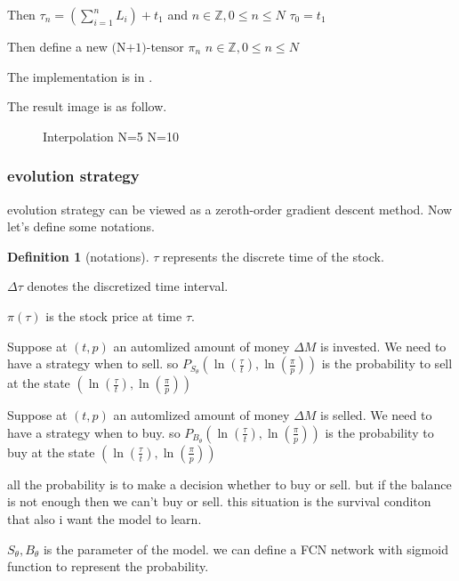 \documentclass{article}
\theoremstyle{definition} %
\newtheorem{definition}{Definition}[section]
\begin{document}
Then $\tau_n=(\sum_{i=1}^{n}L_i)+t_1$
and
$n\in\mathbb{Z},0\leq n\leq N$
$\tau_0=t_1$

Then define a new $\text{(N+1)-tensor}$
$\pi_n$
$n\in\mathbb{Z},0\leq n\leq N$

The implementation is in
\cite[computeGraph]{Data_process}.

The result image is as follow.
\begin{figure}[!ht]
    \centering
    \caption{Interpolation N=5 N=10}
\end{figure}

\subsubsection{evolution strategy}
evolution strategy can be viewed as a
zeroth-order gradient descent method.
Now let's define some notations.
\begin{definition}[notations]
    \label{def:notations}
    $\tau$ represents the discrete time of the stock.

    $\Delta\tau$ denotes the discretized time interval.

    $\pi(\tau)$ is the stock price at time $\tau$.

    Suppose at $(t,p)$
    an automlized amount
    of money $\Delta M$ is invested.
    We need to have a strategy when to sell.
    so $P_{S_\theta}(\ln(\frac{\tau}{t}),\ln(\frac{\pi}{p}))$
    is the probability to sell at the state
    $(\ln(\frac{\tau}{t}),\ln(\frac{\pi}{p}))$

    Suppose at $(t,p)$
    an automlized amount
    of money $\Delta M$ is selled.
    We need to have a strategy when to buy.
    so $P_{B_\theta}(\ln(\frac{\tau}{t}),\ln(\frac{\pi}{p}))$
    is the probability to buy at the state
    $(\ln(\frac{\tau}{t}),\ln(\frac{\pi}{p}))$

    all the probability is to make a decision
    whether to buy or sell. but if the balance is
    not enough then we can't buy or sell.
    this situation is the survival conditon that
    also i want the model to learn.

    $S_\theta,B_\theta$ is the
    parameter of the model.
    we can define a FCN network with sigmoid
    function to represent the probability.


\end{definition}
\end{document}
